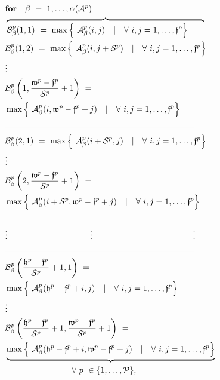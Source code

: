 \documentclass{article}
\begin{document}
\begin{align}
&\textbf{for} \quad \beta \ = \ 1, \ldots, \alpha(\mathcal{A}^p) \label{forall_inputmaps_pool}\\
&\overbrace{\mathcal{B}^p_\beta(1,1) \ = \ \max \left\lbrace \ \mathcal{A}_\beta^p(i,j) \quad | \quad \forall \ i,j=1, \ldots, \mathfrak{f}^p \right\rbrace  \qquad}\label{maxpool_firstrow_firstcolumn}\\
&\mathcal{B}^p_\beta(1,2) \ = \ \max \left\lbrace \ \mathcal{A}_\beta^p(i,j+\mathcal{S}^p) \quad | \quad \forall \ i,j=1, \ldots, \mathfrak{f}^p \right\rbrace \label{maxpool_firstrow_secondcolumn}\\
&\vdots \notag \\
&\mathcal{B}^p_\beta\left(1,\frac{\mathfrak{w}^p -\mathfrak{f}^p}{\mathcal{S}^p}+1\right) \ = \notag \\
&\max \left\lbrace \ \mathcal{A}_\beta^p(i,\mathfrak{w}^p - \mathfrak{f}^p +j) \quad | \quad \forall \ i,j=1, \ldots, \mathfrak{f}^p \right\rbrace \label{maxpool_firstrow_lastcolumn} \\
&\rule{80mm}{.01pt} \notag \\
&\mathcal{B}^p_\beta(2,1) \ = \ \max \left\lbrace \ \mathcal{A}_\beta^p(i+\mathcal{S}^p,j) \quad | \quad \forall \ i,j=1, \ldots, \mathfrak{f}^p \right\rbrace \label{maxpool_secondrow_firstcolumn}\\
&\vdots \notag \\
&\mathcal{B}^p_\beta\left(2,\frac{\mathfrak{w}^p -\mathfrak{f}^p}{\mathcal{S}^p}+1\right) \ = \notag \\
&\max \left\lbrace \ \mathcal{A}_\beta^p(i + \mathcal{S}^p,\mathfrak{w}^p - \mathfrak{f}^p +j) \quad | \quad \forall \ i,j=1, \ldots, \mathfrak{f}^p \right\rbrace \label{maxpool_secondrow_lastcolumn} \\
&\rule{80mm}{.01pt} \notag \\
&\vdots \qquad \qquad \qquad \qquad \qquad  \vdots \qquad \qquad \qquad \qquad  \qquad \qquad \vdots \notag \\
&\rule{80mm}{.01pt} \notag \\
&\mathcal{B}^p_\beta\left( \frac{\mathfrak{h}^p - \mathfrak{f}^p}{\mathcal{S}^p}+1,1\right) \ = \notag \\
&\max \left\lbrace \ \mathcal{A}_\beta^p(\mathfrak{h}^p - \mathfrak{f}^p+i,j) \quad | \quad \forall \ i,j=1, \ldots, \mathfrak{f}^p \right\rbrace \label{maxpool_lastrow_firstcolumn} \\
&\vdots \notag \\
&\mathcal{B}^p_\beta\left( \frac{\mathfrak{h}^p - \mathfrak{f}^p}{\mathcal{S}^p}+1,\frac{\mathfrak{w}^p - \mathfrak{f}^p}{\mathcal{S}^p}+1\right) \ = \notag \\
&\underbrace{\max \left\lbrace \ \mathcal{A}_\beta^p(\mathfrak{h}^p - \mathfrak{f}^p+i,\mathfrak{w}^p - \mathfrak{f}^p+j) \quad | \quad \forall \ i,j=1, \ldots, \mathfrak{f}^p \right\rbrace }\label{maxpool_lastrow_lastcolumn}  \\
& \qquad \qquad \qquad \qquad \forall \ p \ \in \{1, \ldots, \mathcal{P} \}, \notag
\end{align}
\end{document}
